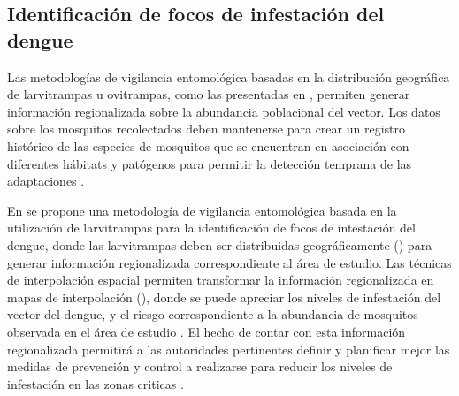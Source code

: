 \subsection{Identificación de focos de infestación del dengue}
\label{sec:cap4-identificacion-focos}
Las metodologías de vigilancia entomológica basadas en la distribución geográfica de larvitrampas
u ovitrampas, como las presentadas en
\cite{NINO2011,petric2012surveillance, journal.pone.0054167,nino2008uso}, permiten generar
información regionalizada sobre la abundancia poblacional del vector. Los datos
sobre los mosquitos recolectados deben mantenerse para crear un registro histórico de las
especies de mosquitos que se encuentran en asociación con diferentes hábitats y patógenos para
permitir la detección temprana de las adaptaciones \cite{petric2012surveillance}.

En \cite{NINO2011} se propone una metodología de vigilancia entomológica basada en la utilización
de larvitrampas para la identificación de focos de intestación del dengue, donde las larvitrampas
deben ser distribuidas geográficamente () para generar
información regionalizada correspondiente al área de estudio. Las técnicas de
interpolación espacial permiten transformar la información regionalizada en mapas de
interpolación (), donde se puede apreciar los niveles
de infestación del vector del dengue, y el riesgo correspondiente a la abundancia de mosquitos
observada en el área de estudio \cite{NINO2011}. El hecho de contar con esta información
regionalizada permitirá a las autoridades pertinentes definir y planificar mejor las medidas de
prevención y control a realizarse para reducir los niveles de infestación en las zonas criticas
\cite{NINO2011, nino2008uso, petric2012surveillance}.


